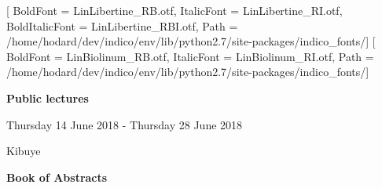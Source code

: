 \documentclass[a4paper, 11pt, twoside]{book} %
\makeatletter
\renewcommand\tableofcontents{%
    \if@twocolumn
      \@restonecoltrue\onecolumn
    \else
      \@restonecolfalse
    \fi
    \chapter*{\contentsname}%
    \@starttoc{toc}%
    \if@restonecol\twocolumn\fi
}
\makeatother
\begin{document}
    \setmainfont{LinLibertine_R.otf}[
        BoldFont = LinLibertine_RB.otf,
        ItalicFont = LinLibertine_RI.otf,
        BoldItalicFont = LinLibertine_RBI.otf,
        Path = /home/hodard/dev/indico/env/lib/python2.7/site-packages/indico_fonts/]
    \setsansfont{LinBiolinum_R.otf}[
        BoldFont = LinBiolinum_RB.otf,
        ItalicFont = LinBiolinum_RI.otf,
        Path = /home/hodard/dev/indico/env/lib/python2.7/site-packages/indico_fonts/]

    \setlength{\parindent}{0cm}


    \newcommand{\truncateellipses}[2]{
       \truncate{#2}{#1}
    }

    \setcounter{secnumdepth}{0}

    
    \setcounter{tocdepth}{0} %

    \frontmatter
    
    

\begin{titlepage}

\thispagestyle{fancy}

\begin{center}
    \fontsize{30}{36}\selectfont \textbf{Public lectures}
\end{center}

\vspace{2em}

    \begin{center}
        \Large
        Thursday 14 June 2018 -
        Thursday 28 June 2018
    \end{center}

        \begin{center}
            \Large
            Kibuye
        \end{center}

    \vspace{2em}

    \vspace{2em}



\vspace{2em}

\begin{center}
    {\fontsize{35}{42}\selectfont \sffamily \textbf{Book of Abstracts}}
\end{center}

    \fancyfoot[C]{}

\end{titlepage}




    
    \tableofcontents


    \mainmatter
    
\end{document}
